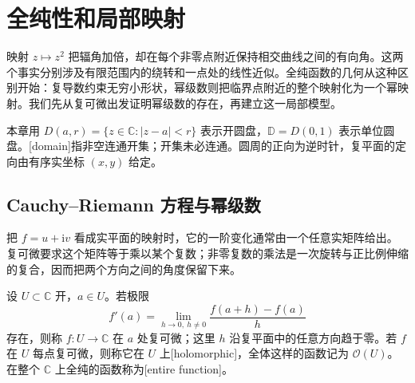 
% 
% 

\section{全纯性和局部映射}
\label{g4:sec:0101}

映射 \(z\mapsto z^2\) 把辐角加倍，却在每个非零点附近保持相交曲线之间的有向角。这两个事实分别涉及有限范围内的绕转和一点处的线性近似。全纯函数的几何从这种区别开始：复导数约束无穷小形状，幂级数则把临界点附近的整个映射化为一个幂映射。我们先从复可微出发证明幂级数的存在，再建立这一局部模型。

\ProseParagraphBreak

本章用 \(D(a,r)=\{z\in\mathbb C:|z-a|<r\}\) 表示开圆盘，\(\mathbb D=D(0,1)\) 表示单位圆盘。[domain]指非空连通开集；开集未必连通。圆周的正向为逆时针，复平面的定向由有序实坐标 \((x,y)\) 给定。

\subsection{Cauchy–Riemann 方程与幂级数}
\label{g4:subsec:0101:01}
把 \(f=u+\mathrm i v\) 看成实平面的映射时，它的一阶变化通常由一个任意实矩阵给出。复可微要求这个矩阵等于乘以某个复数；非零复数的乘法是一次旋转与正比例伸缩的复合，因而把两个方向之间的角度保留下来。

\begin{definition}
	\label{g4:def:0101:holomorphic}
	设 \(U\subset\mathbb C\) 开，\(a\in U\)。若极限
	\[
		f'(a)=\lim_{h\to0,\ h\ne0}\frac{f(a+h)-f(a)}{h}
	\]
	存在，则称 \(f:U\to\mathbb C\) 在 \(a\) 处复可微；这里 \(h\) 沿复平面中的任意方向趋于零。若 \(f\) 在 \(U\) 每点复可微，则称它在 \(U\) 上[holomorphic]，全体这样的函数记为 \(\mathcal O(U)\)。在整个 \(\mathbb C\) 上全纯的函数称为[entire function]。
\end{definition}

